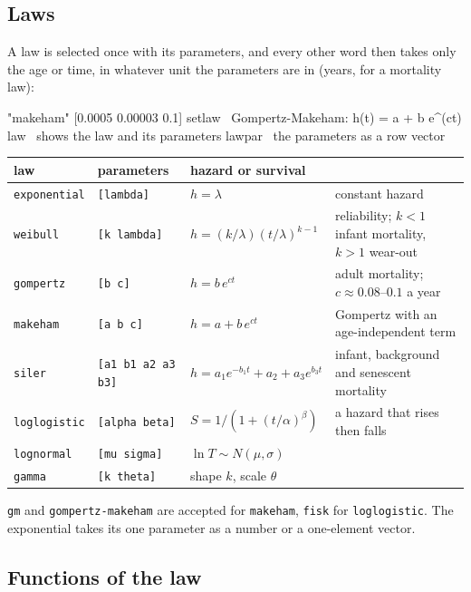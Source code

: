 \documentclass[11pt,letterpaper]{article}
\newcommand{\code}[1]{\texttt{#1}}
\begin{document}
\subsection{Laws}

A law is selected once with its parameters, and every other word then takes only the age or time, in whatever unit the parameters are in (years, for a mortality law):
\begin{rpn}
"makeham" [0.0005 0.00003 0.1] setlaw   \ Gompertz-Makeham: h(t) = a + b e^(ct)
law                                      \ shows the law and its parameters
lawpar                                   \ the parameters as a row vector
\end{rpn}
\begin{center}\small
\begin{tabular}{@{}ll>{\raggedright\arraybackslash}p{}>{\raggedright\arraybackslash}p{}@{}}
\toprule
law & parameters & hazard or survival & \\
\midrule
\code{exponential} & \code{[lambda]} & $h = \lambda$ & constant hazard \\
\code{weibull} & \code{[k lambda]} & $h = (k/\lambda)(t/\lambda)^{k-1}$ & reliability; $k<1$ infant mortality, $k>1$ wear-out \\
\code{gompertz} & \code{[b c]} & $h = b\,e^{ct}$ & adult mortality; $c\approx 0.08$--$0.1$ a year \\
\code{makeham} & \code{[a b c]} & $h = a + b\,e^{ct}$ & Gompertz with an age-independent term \\
\code{siler} & \code{[a1 b1 a2 a3 b3]} & $h = a_1 e^{-b_1 t} + a_2 + a_3 e^{b_3 t}$ & infant, background and senescent mortality \\
\code{loglogistic} & \code{[alpha beta]} & $S = 1/(1 + (t/\alpha)^\beta)$ & a hazard that rises then falls \\
\code{lognormal} & \code{[mu sigma]} & $\ln T \sim N(\mu,\sigma)$ & \\
\code{gamma} & \code{[k theta]} & shape $k$, scale $\theta$ & \\
\bottomrule
\end{tabular}
\end{center}
\code{gm} and \code{gompertz-makeham} are accepted for \code{makeham}, \code{fisk} for \code{loglogistic}. The exponential takes its one parameter as a number or a one-element vector.

\subsection{Functions of the law}
\end{document}
